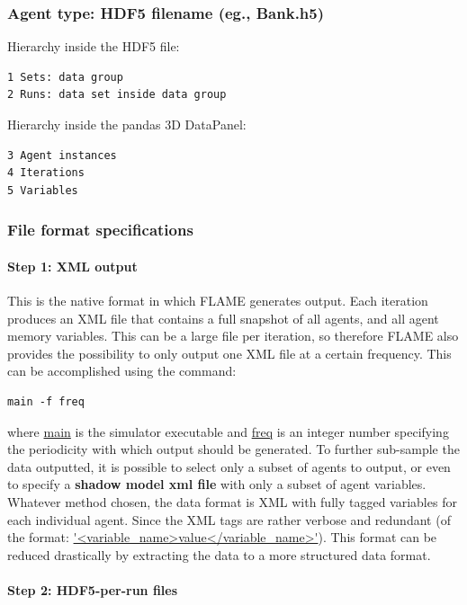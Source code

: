 \documentclass[10pt,a4paper]{article}
\begin{document}
\subsubsection*{Agent type: HDF5 filename (eg., Bank.h5)}

Hierarchy inside the HDF5 file:
\begin{verbatim}
1 Sets: data group
2 Runs: data set inside data group
\end{verbatim}

Hierarchy inside the pandas 3D DataPanel:
\begin{verbatim}
3 Agent instances
4 Iterations
5 Variables
\end{verbatim}

\subsubsection{File format specifications}

\paragraph{Step 1: XML output}

This is the native format in which FLAME generates output. Each iteration produces an XML file that contains a full snapshot of all agents, and all agent memory variables. This can be a large file per iteration, so therefore FLAME also provides the possibility to only output one XML file at a certain frequency. This can be accomplished using the command:

\begin{verbatim}
main -f freq
\end{verbatim}

where \url{main} is the simulator executable and \url{freq} is an integer number specifying the periodicity with which output should be generated.
To further sub-sample the data outputted, it is possible to select only a subset of agents to output, or even to specify a \textbf{shadow model xml file} with only a subset of agent variables. Whatever method chosen, the data format is XML with fully tagged variables for each individual agent. Since the XML tags are rather verbose and redundant (of the format: \url{'<variable_name>value</variable_name>'}). This format can be reduced drastically by extracting the data to a more structured data format.

\paragraph{Step 2: HDF5-per-run files}
\end{document}
